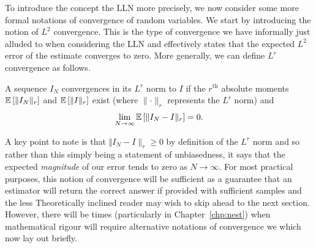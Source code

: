 To introduce the concept the LLN more precisely, we now consider some more formal notations
of convergence of random variables.  We start by introducing the notion of $L^2$ convergence.
This is the type of convergence we have informally just alluded to when considering the LLN
and effectively states that the expected $L^2$ error of the estimate converges to zero.  More generally,
we can define $L^r$ convergence as follows.
\begin{definition}
A sequence $I_N$ convergences in its $L^r$ norm to $I$ if the $r^{\text{th}}$ absolute moments
$\mathbb{E} \left[\lVert I_N\rVert_r\right]$ and $\mathbb{E} \left[\lVert I\rVert_r\right]$ exist 
(where $\lVert \cdot \rVert_r$ represents the $L^r$ norm) and
\begin{align}
\lim\limits_{N\rightarrow\infty} \mathbb{E} \left[\Vert I_N-I\rVert_r\right]=0.
\end{align}
\end{definition}
A key point to note is that $\Vert I_N-I\rVert_r\ge0$ by definition of the $L^r$ norm and so
rather than this simply being a statement of unbiasedness, it says that the expected
\emph{magnitude} of our error tends to zero as $N\rightarrow\infty$.  For most practical
purposes, this notion of convergence will be sufficient as a guarantee that an estimator will
return the correct answer if provided with sufficient samples and the less Theoretically
inclined reader may wish to skip ahead to the next section.  However, there will be times
(particularly in Chapter~\ref{chp:nest}) when mathematical rigour will require
alternative notations of convergence we which now lay out briefly.


